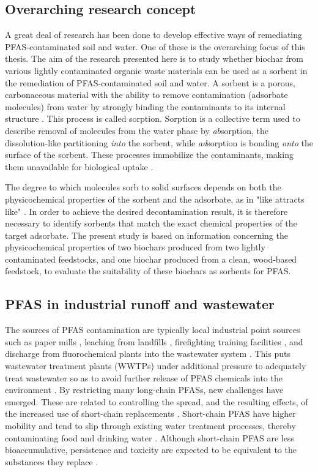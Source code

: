 \subsection{Overarching research concept}
A great deal of research has been done to develop effective ways of remediating PFAS-contaminated soil and water. One of these is the overarching focus of this thesis. The aim of the research presented here is to study whether biochar from various lightly contaminated organic waste materials can be used as a sorbent in the remediation of PFAS-contaminated soil and water. A sorbent is a porous, carbonaceous material with the ability to remove contamination (adsorbate molecules) from water by strongly binding the contaminants to its internal structure \citep{LehmannAndJoseph2015}. This process is called sorption. Sorption is a collective term used to describe removal of molecules from the water phase by \textit{ab}sorption, the dissolution-like partitioning \textit{into} the sorbent, while \textit{ad}sorption is bonding \textit{onto} the surface of the sorbent. These processes immobilize the contaminants, making them unavailable for biological uptake \citep{crccare2017assessment}. 

The degree to which molecules sorb to solid surfaces depends on both the physicochemical properties of the sorbent and the adsorbate, as in "like attracts like" \citep{ball2012like}. In order to achieve the desired decontamination result, it is therefore necessary to identify sorbents that match the exact chemical properties of the target adsorbate. The present study is based on information concerning the physicochemical properties of two biochars produced from two lightly contaminated feedstocks, and one biochar produced from a clean, wood-based feedstock, to evaluate the suitability of these biochars as sorbents for PFAS.

\subsection{PFAS in industrial runoff and wastewater}
The sources of PFAS contamination are typically local industrial point sources such as paper mills \citep{lee2020legacy,langberg2021paper}, leaching from landfills \citep{masoner2020landfill}, firefighting training facilities \citep{filipovic2015historical}, and discharge from fluorochemical plants into the wastewater system \citep{gebbink2017presence}. This puts wastewater treatment plants (\acrshort{WWTPs}) under additional pressure to adequately treat wastewater so as to avoid further release of PFAS chemicals into the environment \citep{Morin2017flameWaste}. By restricting many long-chain PFASs, new challenges have emerged. These are related to controlling the spread, and the resulting effects, of the increased use of short-chain replacements \citep{knutsen2019leachate}. Short-chain PFAS have higher mobility and tend to slip through existing water treatment processes, thereby contaminating food and drinking water \citep{hale2020persistent,brendel2018short}. Although short-chain PFAS are less bioaccumulative, persistence and toxicity are expected to be equivalent to the substances they replace \citep{EC2020PFAS}. 


